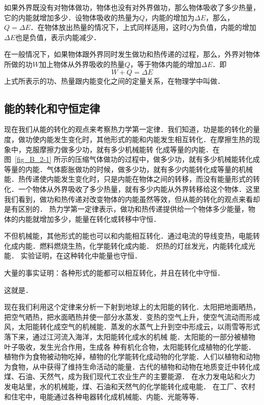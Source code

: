 如果外界既没有对物体做功，物体也没有对外界做功，那么物体吸收了多少热量，它的内能就增加多少．设物体吸收的热量为$Q$，内能的增加为$\Delta E$，那么，$Q=\Delta E$．在物体放出热量的情况下，上式同样适用，这时$Q$为负值，内能的增加$\Delta E$也是负值，表示内能减少．

在一般情况下，如果物体跟外界同时发生做功和热传递的过程，那么，外界对物体所做的功$W$加上物体从外界吸收的热量$Q$，等于物体内能的增加$\Delta E$．即
\[W+Q=\Delta E\]
上式所表示的功、热量跟内能变化之间的定量关系，在物理学中叫做．

\subsection{能的转化和守恒定律} 
现在我们从能的转化的观点来考察热力学第一定律．我们知道，功是能的转化的量度，做功使内能发生变化时，其他形式的能和内能发生相互转化．在摩擦生热的现象中，克服摩擦力做多少功，就有多少机械能转
化成等量的内能．在图~\ref{fig_B_2-1} 所示的压缩气体做功的过程中，做多少功，就有多少机械能转化成等量的内能．气体膨胀做功的时候，做多少功，就有多少内能转化成等量的机械能．热传递使内能发生变化时，只是内能在物体之间的转移，而没有能量形式的转化．一个物体从外界吸收了多少热量，就有多少内能从外界转移给这个物体．这里我们看到，做功和热传递对改变物体的内能虽然等效，但从能的转化的观点来看却是有区别的．
热力学第一定律表示，做功和热传递提供给一个物体多少能量，物体的内能就增加多少，能量在转化或转移中守恒．

不但机械能，其他形式的能也可以和内能相互转化．通过电流的导线变热，电能转化成内能．燃料燃烧生热，化学能转化成内能．
炽热的灯丝发光，内能转化成光能．
实验证明，在这种转化中能量也守恒．

大量的事实证明：各种形式的能都可以相互转化，并且在转化中守恒．


这就是．

现在我们利用这个定律来分析一下射到地球上的太阳能的转化．太阳把地面晒热，把空气晒热，把水面晒热并使一部分水蒸发．变热的空气上升，使空气流动而形成风，太阳能转化成空气的机械能．蒸发的水蒸气上升到空中形成云，以雨雪等形式落下来，通过江河流入海洋，太阳能转化成水的机械
能．太阳能的一部分被植物叶子吸收，发生光合作用，生成各
种有机化合物，太阳能转化成植物的化学能．植物作为食物被动物吃掉，植物的化学能转化成动物的化学能．人们以植物和动物为食物，从中获得了维持生命活动的能量．古代的植物和动物在地质变迁中转化成煤、石油、天然气，成为我们现代工农业生产的主要能源．
在水力发电站和火力发电站里，水的机械能，煤、石油和天然气的化学能转化成电能．
在工厂、农村和住宅中，电能通过各种电器转化成机械能、内能、光能等等．


